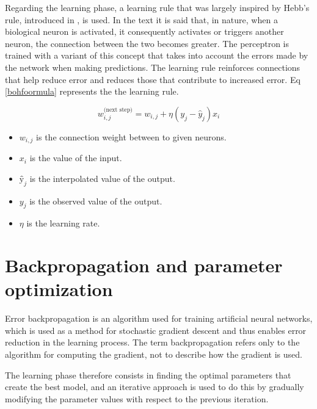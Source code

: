 Regarding the learning phase, a learning rule that was largely inspired by Hebb's rule, introduced in \citeauthor{Morris1999} \autocite{Morris1999}, is used. In the text it is said that, in nature, when a biological neuron is activated, it consequently activates or triggers another neuron, the connection between the two becomes greater. The perceptron is trained with a variant of this concept that takes into account the errors made by the network when making predictions. The learning rule reinforces connections that help reduce error and reduces those that contribute to increased error. Eq \eqref{bohfoormula} represents the the learning rule.

\begin{equation}
w_{i,j}^{\text{(next step)}} = w_{i,j} + \eta(y_j - \hat{y}_j) x_i
\label{bohformula}
\end{equation}

\begin{itemize}
    \item $w _{i, j}$ is the connection weight between to given neurons.
    \item $x_{i} $ is the value of the input.
    \item $ŷ _{j}$ is the interpolated value of the output.
    \item $y_{j}$ is the observed value of the output.
    \item $\eta$ is the learning rate.
\end{itemize}

\clearpage

\section{Backpropagation and parameter optimization} \label{backprop}
Error backpropagation is an algorithm used for training artificial neural networks, which is used as a method for stochastic gradient descent and thus enables error reduction in the learning process. The term backpropagation refers only to the algorithm for computing the gradient, not to describe how the gradient is used.

The learning phase therefore consists in finding the optimal parameters that create the best model, and an iterative approach is used to do this by gradually modifying the parameter values with respect to the previous iteration.

